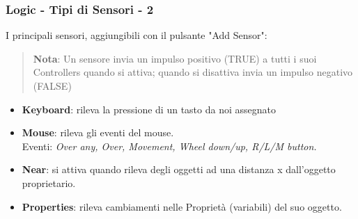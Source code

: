 \documentclass{beamer}
\begin{document}
		\begin{frame}
			\frametitle{Logic - Tipi di Sensori - 2}
			I principali sensori, aggiungibili con il pulsante "Add Sensor":
			\begin{quote}
			\textcolor{BlenderOrange}{\textbf{Nota}: Un sensore invia un impulso positivo (TRUE) a tutti i suoi Controllers quando si attiva; quando si disattiva invia un impulso negativo (FALSE)}
			\end{quote}
			\begin{itemize}
				\item \textbf{Keyboard}: rileva la pressione di un tasto da noi assegnato %
				\item \textbf{Mouse}: rileva gli eventi del mouse. \\ {\footnotesize\hspace{1em}Eventi: \textit{Over any, Over, Movement, Wheel down/up, R/L/M button.}}
				\item \textbf{Near}: si attiva quando rileva degli oggetti ad una distanza x dall'oggetto proprietario.
				\item \textbf{Properties}: rileva cambiamenti nelle Proprietà (variabili) del suo oggetto.
			\end{itemize}
		\end{frame}	
		
\end{document}
